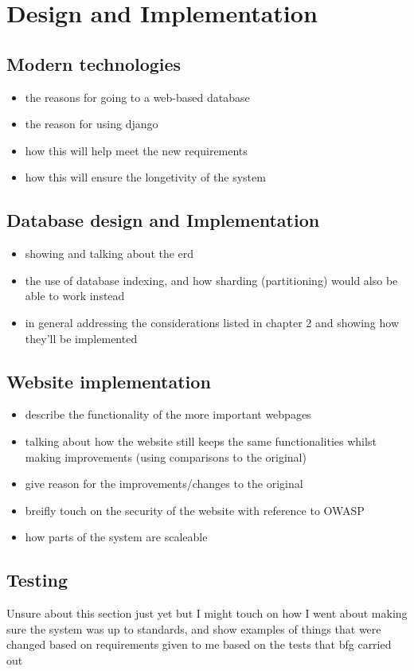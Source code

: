 
\chapter{Design and Implementation}

\section{Modern technologies}
\begin{itemize}
\item the reasons for going to a web-based database
\item the reason for using django
\item how this will help meet the new requirements
\item how this will ensure the longetivity of the system
\end{itemize}

\section{Database design and Implementation}
\begin{itemize}
\item showing and talking about the erd
\item the use of database indexing, and how sharding (partitioning) would also be able to work instead
\item in general addressing the considerations listed in chapter 2 and showing how they'll be implemented
\end{itemize}

\section{Website implementation}
\begin{itemize}
\item describe the functionality of the more important webpages
\item talking about how the website still keeps the same functionalities whilst making improvements (using comparisons to the original)
\item give reason for the improvements/changes to the original
\item breifly touch on the security of the website with reference to OWASP
\item how parts of the system are scaleable
\end{itemize}

\section{Testing}
Unsure about this section just yet but I might touch on how I went about making sure the system was up to standards,
and show examples of things that were changed based on requirements given to me based on the tests that bfg carried out